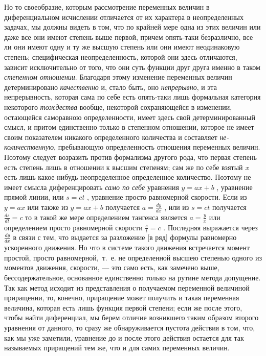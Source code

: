 {Но то своеобразие, которым рассмотрение переменных величин в диференциальном
исчислении отличается от их характера в неопределенных задачах, мы должны
видеть в том, что по крайней мере одна из этих величин или даже все они
имеют степень выше первой, причем опять-таки безразлично, все ли они имеют
одну и ту же высшую степень или они имеют неодинаковую степень;
специфическая неопределенность, которой они здесь отличаются, зависит
исключительно от того, что они суть функции друг друга именно в таком
{\em степенном отношении}. Благодаря этому изменение
переменных величин детерминировано {\em качественно} и,
стало быть, оно {\em непрерывно}, и эта непрерывность,
которая сама по себе есть опять-таки лишь формальная категория некоторого
{\em тождества} вообще, некоторой сохраняющейся в
изменении, остающейся саморавною определенности, имеет здесь свой
детерминированный смысл, и притом единственно только в степенном отношении,
которое не имеет своим показателем никакого определенного количества и
составляет {\em не-количественную}, пребывающую
определенность отношения переменных величин. Поэтому следует возразить
против формализма другого рода, что первая степень есть степень лишь в
отношении к высшим степеням; сам же по себе взятый
{\em x} есть лишь какое-нибудь неопределенное
определенное количество. Поэтому не имеет смысла диференцировать
{\em само по себе} уравнения  $y=\mathit{ax}+b$ ,
уравнение прямой линии, или  $s=\mathit{ct}$ , уравнение просто равномерной
скорости. Если из  $y=\mathit{ax}$  или также из  $y=\mathit{ax}+b$ 
получается  $a=\frac{\mathit{dy}}{\mathit{dx}}$  , или из  $s=\mathit{ct}$ 
получается  $\frac{\mathit{ds}}{\mathit{dt}}=c$  то в такой же мере
определением тангенса является  $a=\frac y x$ или определением просто
равномерной скорости  $\frac s t=c$ . Последняя выражается через 
$\frac{\mathit{dy}}{\mathit{dx}}$  в связи с тем, что выдается за
разложение [в ряд] формулы равномерно ускоренного движения. Но что в
системе такого движения встречается момент простой, просто
равномерной,~т.~е. не определенной высшею степенью одного из моментов
движения, скорости, — это само есть, как замечено выше, бессодержательное,
основанное единственно только на рутине метода допущение. Так как метод
исходит из представления о получаемом переменной величиной приращении, то,
конечно, приращение может получить и такая переменная величина, которая
есть лишь функция первой степени; если же после этого, чтобы найти
диференциал, мы берем отличие возникшего таким образом второго уравнения от
данного, то сразу же обнаруживается пустота действия в том, что, как мы уже
заметили, уравнение до и после этого действия остается для так называемых
приращений тем же, что и для самих переменных величин.

}
